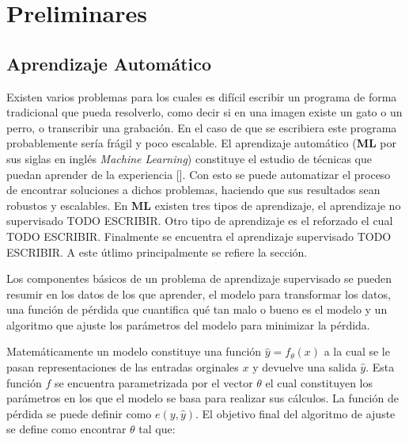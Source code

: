 \chapter{Preliminares}\label{chapter:background}


\section{Aprendizaje Automático}

Existen varios problemas para los cuales es difícil escribir un programa de forma tradicional que pueda
resolverlo, como decir si en una imagen existe un gato o un perro, o transcribir una grabación. En el caso
de que se escribiera este programa probablemente sería frágil y poco escalable. El aprendizaje automático
(\textbf{ML} por sus siglas en inglés \emph{Machine Learning}) constituye el estudio de técnicas que puedan 
aprender de la experiencia [\cite{d2l}]. Con esto se puede automatizar el proceso de encontrar soluciones a 
dichos problemas, haciendo que sus resultados sean robustos y escalables. En \textbf{ML} existen tres tipos de 
aprendizaje, el aprendizaje no supervisado TODO ESCRIBIR. Otro tipo de aprendizaje es el reforzado el cual 
TODO ESCRIBIR. Finalmente se encuentra el aprendizaje supervisado TODO ESCRIBIR. A este útlimo principalmente 
se refiere la sección.

Los componentes básicos de un problema de aprendizaje supervisado se pueden resumir en los datos de los que 
aprender, el modelo para transformar los datos, una función de pérdida que cuantifica qué tan malo o bueno es el 
modelo y un algoritmo que ajuste los parámetros del modelo para minimizar la pérdida.

Matemáticamente un modelo constituye una función $\hat{y} = f_{\theta}(x)$ a la cual se 
le pasan representaciones de las entradas orginales $x$ y devuelve una salida $\hat{y}$. Esta función $f$ se encuentra
parametrizada por el vector $\theta$ el cual constituyen los parámetros en los que el modelo se basa para realizar sus
cálculos. La función de pérdida se puede definir como $e(y, \hat{y})$. El objetivo final del algoritmo de ajuste 
se define como encontrar $\theta$ tal que:

